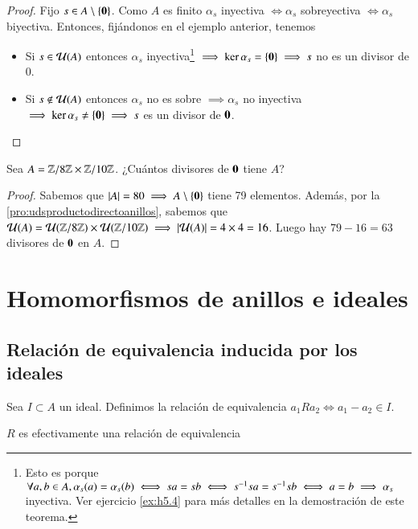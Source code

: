 \begin{proof}
	Fijo $s \in A \setminus \{\mathbf{0}\}$. Como $A$ es finito $\alpha_s$ inyectiva $\iff \alpha_s$ sobreyectiva $\iff \alpha_s$ biyectiva. Entonces, fijándonos en el ejemplo anterior, tenemos
	\begin{itemize}
		\item Si $s \in \mathcal{U}(A)$ entonces $\alpha_s$ inyectiva\footnote{Esto es porque $\forall a,b \in A, \alpha_s(a) = \alpha_s(b) \iff sa = sb \iff s^{-1}sa = s^{-1}sb \iff a = b \implies \alpha_s$ inyectiva. Ver ejercicio \autoref{ex:h5.4} para más detalles en la demostración de este teorema.} $\implies \ker \alpha_s = \{\mathbf{0}\} \implies s$ no es un divisor de $0$.
		\item Si $s \notin \mathcal{U}(A)$ entonces $\alpha_s$ no es sobre $\implies \alpha_s$ no inyectiva $\implies \ker \alpha_s \neq \{\mathbf{0}\} \implies s$ es un divisor de $\mathbf{0}$.
	\end{itemize}
\end{proof}

\begin{ej}
	Sea $A = \mathbb{Z}/8\mathbb{Z} \times \mathbb{Z}/10\mathbb{Z}$. ¿Cuántos divisores de $\mathbf{0}$ tiene $A$?
\end{ej}

\begin{proof}
	Sabemos que $|A| = 80 \implies A \setminus \{\mathbf{0}\}$ tiene 79 elementos. Además, por la \autoref{pro:udsproductodirectoanillos}, sabemos que $\mathcal{U}(A) = \mathcal{U}(\mathbb{Z}/8\mathbb{Z}) \times \mathcal{U}(\mathbb{Z}/10\mathbb{Z}) \implies |\mathcal{U}(A)| = 4 \times 4 = 16$. Luego hay $79 - 16 = 63$ divisores de $\mathbf{0}$ en $A$.
\end{proof}

\section{Homomorfismos de anillos e ideales}

\subsection{Relación de equivalencia inducida por los ideales}

\begin{dfn}
	Sea $I \subset A$ un ideal. Definimos la relación de equivalencia $a_1 R a_2 \iff a_1 - a_2 \in I$.
\end{dfn}

\begin{pro}
	$R$ es efectivamente una relación de equivalencia
\end{pro}

